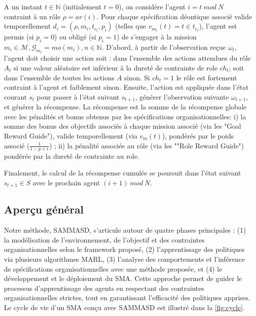\documentclass[sigconf,anonymous]{aamas}
\begin{document}
A un instant $t \in \mathbb{N}$ (initialement $t = 0$), on considère l'agent $i = t \ mod \ N$ contraint à un rôle $\rho = ar(i)$. Pour chaque spécification déontique associé valide temporellement $d_i = (\rho,m_i,t_{c_i},p_i)$ (telles que $v_{m_i}(t) = t \in t_{c_i}$), l'agent est permis (si $p_i = 0$) ou obligé (si $p_i = 1$) de s'engager à la mission $m_i \in \mathcal{M}, \mathcal{G}_{m_i} = mo(m_i), n \in \mathbb{N}$.
%
D'abord, à partir de l'observation reçue $\omega_t$, l'agent doit choisir une action soit : dans l'ensemble des actions attendues du rôle $A_t$ si une valeur aléatoire est inférieur à la dureté de contrainte de role $ch_t$; soit dans l'ensemble de toutes les actions $A$ sinon. Si $ch_t = 1$ le rôle est fortement contraint à l'agent et faiblement sinon.
%
Ensuite, l'action est appliquée dans l'état courant $s_t$ pour passer à l'état suivant $s_{t+1}$, générer l'observation suivante $\omega_{t+1}$, et générer la récompense. La récompense est la somme de la récompense globale avec les pénalités et bonus obtenus par les spécifications organisationnelles: \quad i) la somme des bonus des objectifs associés à chaque mission associé (via les "Goal Reward Guide"), valide temporellement (via $v_m(t)$), pondérés par le poids associé ($\frac{1}{1-p+\epsilon}$) ; \quad ii) la pénalité associée au rôle (via les ""Role Reward Guide") pondérée par la dureté de contrainte au role.

Finalement, le calcul de la récompense cumulée se poursuit dans l'état suivant $s_{t+1} \in S$ avec le prochain agent $(i+1) \ mod \ N$.

\subsection{Aperçu général}

Notre méthode, SAMMASD, s'articule autour de quatre phases principales : (1) la modélisation de l'environnement, de l'objectif et des contraintes organisationnelles selon le framework proposé, (2) l'apprentissage des politiques via plusieurs algorithmes MARL, (3) l'analyse des comportements et l'inférence de spécifications organisationnelles avec une méthode proposée, et (4) le développement et le déploiement du SMA. Cette approche permet de guider le processus d'apprentissage des agents en respectant des contraintes organisationnelles strictes, tout en garantissant l'efficacité des politiques apprises. Le cycle de vie d'un SMA conçu avec SAMMASD est illustré dans la \autoref{fig:cycle}.

\end{document}
